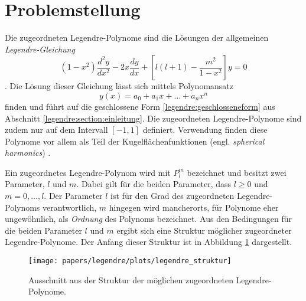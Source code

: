 %
%
%
\section{Problemstellung
\label{legendre:section:problemstellung}}
Die zugeordneten Legendre-Polynome sind die Lösungen der allgemeinen {\em Legendre-Gleichung}
\begin{equation}
(1-x^2) \frac{d^2y}{dx^2}
-2x \frac{dy}{dx}
+ \left[ l(l+1)- \frac{m^2}{1-x^2} \right] y
=0
\label{legendre:legendregleichung}
\end{equation}
\cite{legendre:assoc-legendre-poly-wolfram} \cite{legendre:assoc-legendre-diff-wolfram}.
Die Lösung dieser Gleichung lässt sich mittels Polynomansatz
\begin{equation}
y(x)=a_0+a_1x+ \ldots + a_nx^n
\label{legendre:polynomansatz}
\end{equation}
%
finden und führt auf die geschlossene Form \eqref{legendre:geschlosseneform} aus Abschnitt \ref{legendre:section:einleitung}.
Die zugeordneten Legendre-Polynome sind zudem nur auf dem Intervall $[-1, 1]$ definiert.
Verwendung finden diese Polynome vor allem als Teil der Kugelflächenfunktionen (engl. {\em spherical harmonics}) \cite{legendre:spherical-harmonic-wolfram}.
%

Ein zugeordnetes Legendre-Polynom wird mit $P^m_l$ bezeichnet und besitzt zwei Parameter, $l$ und $m$.
Dabei gilt für die beiden Parameter, dass $l\geq 0$ und $m=0, \ldots , l$.
Der Parameter $l$ ist für den Grad des zugeordneten Legendre-Polynoms verantwortlich, $m$ hingegen wird mancherorts, für Polynome eher ungewöhnlich, als {\em Ordnung} des Polynoms bezeichnet.
Aus den Bedingungen für die beiden Parameter $l$ und $m$ ergibt sich eine Struktur möglicher zugeordneter Legendre-Polynome.
Der Anfang dieser Struktur ist in Abbildung \ref{legendre:fig:struktur} dargestellt.
\begin{figure}[!ht]
\centering
\texttt{[image: papers/legendre/plots/legendre\_struktur]}
\caption{Ausschnitt aus der Struktur der möglichen zugeordneten Legendre-Polynome.}
\label{legendre:fig:struktur}
\end{figure}

